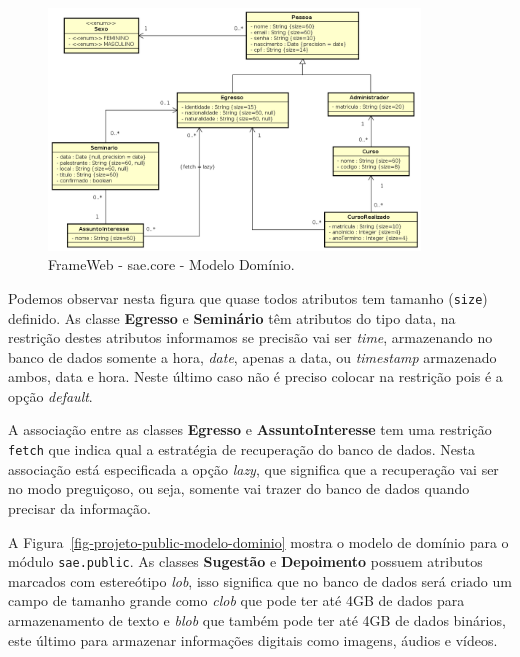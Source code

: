 \begin{figure}[!h]
	\centering
	\includegraphics[width=0.88\textwidth]{figuras/projeto/fig-projeto-core-modelo-dominio}
	\caption{FrameWeb - sae.core - Modelo Domínio.}
	\label{fig-projeto-core-modelo-dominio}
\end{figure}



Podemos observar nesta figura que quase todos atributos tem tamanho (\texttt{size}) definido. As classe \textbf{Egresso} e \textbf{Seminário} têm atributos do tipo data, na restrição destes atributos informamos se precisão vai ser \textit{time}, armazenando no banco de dados somente a hora, \textit{date}, apenas a data, ou \textit{timestamp} armazenado ambos, data e hora. Neste último caso não é preciso colocar na restrição pois é a opção \textit{default}.

A associação entre as classes \textbf{Egresso} e \textbf{AssuntoInteresse} tem uma restrição \texttt{fetch} que indica qual a estratégia de recuperação do banco de dados. Nesta associação está especificada a opção \textit{lazy}, que significa que a recuperação vai ser no modo preguiçoso, ou seja, somente vai trazer do banco de dados quando precisar da informação.

A Figura~\ref{fig-projeto-public-modelo-dominio} mostra o modelo de domínio para o módulo \texttt{sae.public}. As classes \textbf{Sugestão} e \textbf{Depoimento} possuem atributos marcados com estereótipo \textit{lob}, isso significa que no banco de dados será criado um campo de tamanho grande como \textit{clob} que pode ter até 4GB de dados para armazenamento de texto e \textit{blob} que também pode ter até 4GB de dados binários, este último para armazenar informações digitais como imagens, áudios e vídeos.  

